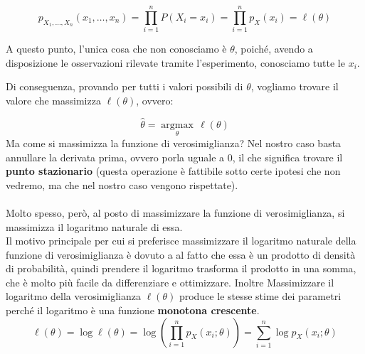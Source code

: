 \[
p_{X_1, \ldots, X_n}(x_1, \ldots, x_n) = \prod_{i=1}^{n} P(X_i = x_i) = \prod_{i=1}^{n} p_X(x_i) = \ell(\theta)
\]

\noindent A questo punto, l'unica cosa che non conosciamo è $\theta$, poiché, avendo a disposizione le osservazioni rilevate tramite l'esperimento, conosciamo tutte le $x_i$.

\noindent Di conseguenza, provando per tutti i valori possibili di $\theta$, vogliamo trovare il valore che massimizza $\ell(\theta)$, ovvero:

\[
\hat{\theta} = \underset{\theta}{\operatorname{argmax}} \, \ell(\theta)
\]
\noindent Ma come si massimizza la funzione di verosimiglianza? Nel nostro caso basta annullare la derivata prima, ovvero porla uguale a $0$, il che significa trovare il \textbf{punto stazionario} (questa operazione è fattibile sotto certe ipotesi che non vedremo, ma che nel nostro caso vengono rispettate).
\\ \\
\noindent Molto spesso, però, al posto di massimizzare la funzione di verosimiglianza, si massimizza il logaritmo naturale di essa.
\\
Il motivo principale per cui si preferisce massimizzare il logaritmo naturale della funzione di verosimiglianza è dovuto a al fatto che essa è un prodotto di densità di probabilità, quindi prendere il logaritmo trasforma il prodotto in una somma, che è molto più facile da differenziare e ottimizzare. Inoltre Massimizzare il logaritmo della verosimiglianza $\ell(\theta)$ produce le stesse stime dei parametri perché il logaritmo è una funzione \textbf{monotona crescente}.
    \[
    \ell(\theta) = \log \ell(\theta) = \log \left( \prod_{i=1}^{n} p_X(x_i; \theta) \right) = \sum_{i=1}^{n} \log p_X(x_i; \theta)
    \]

